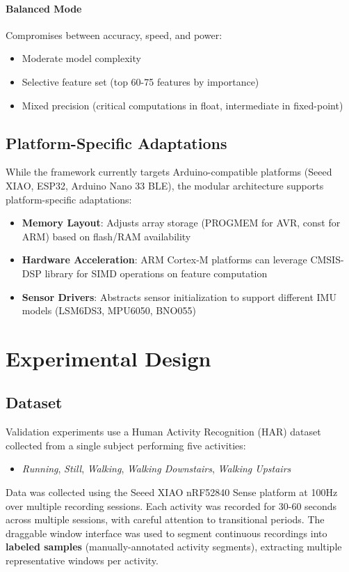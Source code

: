 \paragraph{Balanced Mode}
Compromises between accuracy, speed, and power:
\begin{itemize}
    \item Moderate model complexity
    \item Selective feature set (top 60-75 features by importance)
    \item Mixed precision (critical computations in float, intermediate in fixed-point)
\end{itemize}

\subsection{Platform-Specific Adaptations}
While the framework currently targets Arduino-compatible platforms (Seeed XIAO, ESP32, Arduino Nano 33 BLE), the modular architecture supports platform-specific adaptations:
\begin{itemize}
    \item \textbf{Memory Layout}: Adjusts array storage (PROGMEM for AVR, const for ARM) based on flash/RAM availability
    \item \textbf{Hardware Acceleration}: ARM Cortex-M platforms can leverage CMSIS-DSP library for SIMD operations on feature computation
    \item \textbf{Sensor Drivers}: Abstracts sensor initialization to support different IMU models (LSM6DS3, MPU6050, BNO055)
\end{itemize}

\section{Experimental Design}

\subsection{Dataset}
Validation experiments use a Human Activity Recognition (HAR) dataset collected from a single subject performing five activities:
\begin{itemize}
    \item \textit{Running}, \textit{Still}, \textit{Walking}, \textit{Walking Downstairs}, \textit{Walking Upstairs}
\end{itemize}
Data was collected using the Seeed XIAO nRF52840 Sense platform at 100Hz over multiple recording sessions. Each activity was recorded for 30-60 seconds across multiple sessions, with careful attention to transitional periods. The draggable window interface was used to segment continuous recordings into \textbf{labeled samples} (manually-annotated activity segments), extracting multiple representative windows per activity. 


